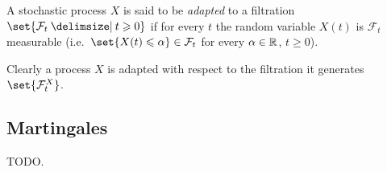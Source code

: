 \begin{definition}
  A stochastic process $X$ is said to be \emph{adapted} to a filtration $\set{\mathcal F_t \st t \geq 0}$ if for every $t$ the random variable $X(t)$ is $\mathcal F_t$ measurable (i.e.\ $\set{X(t) \leq \alpha} \in \mathcal F_t$ for every $\alpha \in \mathbb{R}$, $t \geq 0$).
\end{definition}

Clearly a process $X$ is adapted with respect to the filtration it generates $\set{\mathcal F_t^X}$.

\subsection{Martingales}

TODO.

